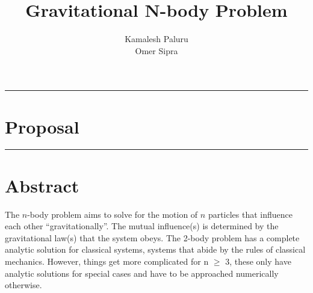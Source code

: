 \documentclass[hidelinks, 11pt, dvipsnames]{article}
\title{Gravitational N-body Problem}
\author{Kamalesh Paluru \\ Omer Sipra}
\newcommand{\psection}[1]{{
    \begin{center}
        \noindent \rule{17cm}{0.4pt}
            \section*{\LARGE #1}
        \noindent \rule{17cm}{0.4pt}
    \end{center}
}}
\newcommand{\psubsection}[1]{
    \noindent 
    \section*{#1}
}
\begin{document}
\maketitle

\newpage

\psection{Proposal}

\psubsection{Abstract}
The $n$-body problem aims to solve for the motion of $n$ particles that influence each other ``gravitationally''. The mutual influence(s) is determined by the gravitational law(s) that the system obeys. The 2-body problem has a complete analytic solution for classical systems, systems that abide by the rules of classical mechanics. However, things get more complicated for n $\ge$ 3, these only have analytic solutions for special cases and have to be approached numerically otherwise.
\end{document}
